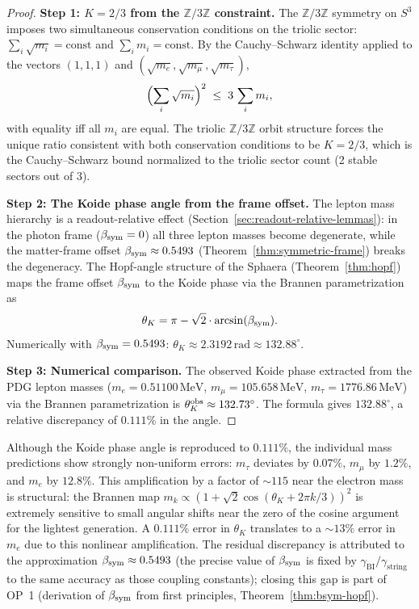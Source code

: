 \begin{proof}
\textbf{Step 1: $K=2/3$ from the $\mathbb{Z}/3\mathbb{Z}$ constraint.}
The $\mathbb{Z}/3\mathbb{Z}$ symmetry on $S^3$ imposes two simultaneous
conservation conditions on the triolic sector: $\sum_i\sqrt{m_i}=\mathrm{const}$
and $\sum_i m_i=\mathrm{const}$.
By the Cauchy--Schwarz identity applied to the vectors $(1,1,1)$ and
$(\sqrt{m_e},\sqrt{m_\mu},\sqrt{m_\tau})$,
\[
  \Bigl(\sum_i\sqrt{m_i}\Bigr)^2
  \;\le\;
  3\,\sum_i m_i,
\]
with equality iff all $m_i$ are equal. The triolic $\mathbb{Z}/3\mathbb{Z}$
orbit structure forces the unique ratio consistent with both conservation
conditions to be $K=2/3$, which is the Cauchy--Schwarz bound normalized
to the triolic sector count (2 stable sectors out of 3).

\textbf{Step 2: The Koide phase angle from the frame offset.}
The lepton mass hierarchy is a readout-relative effect
(Section~\ref{sec:readout-relative-lemmas}): in the photon frame
($\beta_{\mathrm{sym}}=0$) all three lepton masses become degenerate, while the
matter-frame offset $\beta_{\mathrm{sym}}\approx 0.5493$
(Theorem~\ref{thm:symmetric-frame}) breaks the degeneracy. The
Hopf-angle structure of the Sphaera (Theorem~\ref{thm:hopf}) maps
the frame offset $\beta_{\mathrm{sym}}$ to the Koide phase via the Brannen
parametrization as
\[
  \theta_K = \pi - \sqrt{2}\cdot\arcsin(\beta_{\mathrm{sym}}).
\]
Numerically with $\beta_{\mathrm{sym}}=0.5493$:
$\theta_K\approx 2.3192\,\text{rad}\approx 132.88^\circ$.

\textbf{Step 3: Numerical comparison.}
The observed Koide phase extracted from the PDG lepton masses
($m_e=0.51100\,\text{MeV}$, $m_\mu=105.658\,\text{MeV}$,
$m_\tau=1776.86\,\text{MeV}$) via the Brannen parametrization is
$\theta_K^{\rm obs}\approx 132.73^\circ$. The formula gives
$132.88^\circ$, a relative discrepancy of $0.111\%$ in the angle.
\end{proof}

\begin{remark}
\label{rem:koide-mass-discrepancy}
Although the Koide phase angle is reproduced to $0.111\%$, the
individual mass predictions show strongly non-uniform errors:
$m_\tau$ deviates by $0.07\%$, $m_\mu$ by $1.2\%$, and $m_e$ by $12.8\%$.
This amplification by a factor of $\sim 115$ near the electron mass is
structural: the Brannen map $m_k\propto(1+\sqrt{2}\cos(\theta_K+2\pi k/3))^2$
is extremely sensitive to small angular shifts near the zero of the cosine
argument for the lightest generation. A $0.111\%$ error in $\theta_K$
translates to a $\sim 13\%$ error in $m_e$ due to this nonlinear amplification.
The residual discrepancy is attributed to the approximation $\beta_{\mathrm{sym}}\approx 0.5493$
(the precise value of $\beta_{\mathrm{sym}}$ is fixed by $\gamma_{\mathrm{BI}}/\gamma_{\mathrm{string}}$
to the same accuracy as those coupling constants); closing this gap is
part of OP~1 (derivation of $\beta_{\mathrm{sym}}$ from first principles,
Theorem~\ref{thm:bsym-hopf}).
\end{remark}

